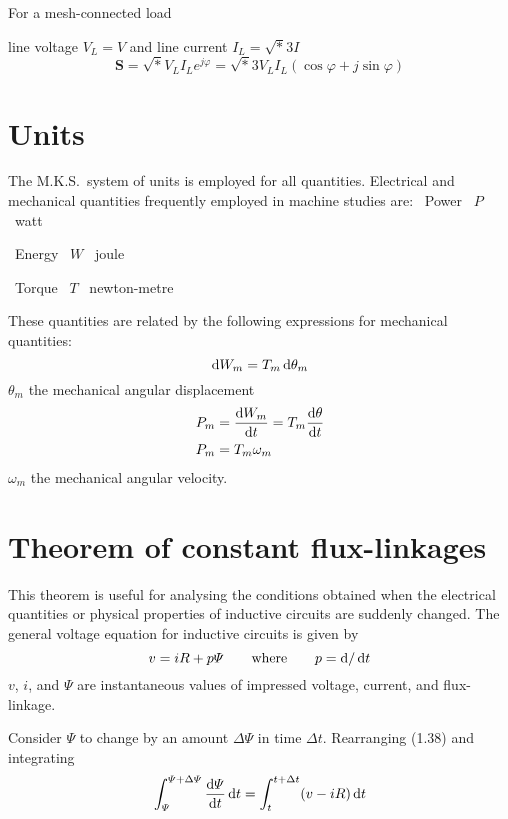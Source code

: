 \documentclass[a4paper,numbers=noenddot,12pt]{scrbook}
\begin{document}
For a mesh-connected load

\hspace{1cm} line voltage $V_L = V$ and line current $I_L = \sqrt* 3 I$
\begin{equation}
    \mathbf{S} = \sqrt*  V_L I_L e^{j \varphi} = \sqrt* 3 V_L I_L (\cos \varphi + j \sin \varphi)
    \label{eq:Eq1.35}
\end{equation}

\section{Units}
The M.K.S.\ system of units is employed for all quantities. Electrical and mechanical quantities frequently employed in machine studies are:
\TabPositions{3cm,4.5cm,5.2cm}
\tab\tab\ Power \tab\ $P$ \tab\ watt

\tab\ Energy \tab\ $W$ \tab\ joule

\tab\ Torque \tab\ $T$ \tab\ newton-metre

These quantities are related by the following expressions for mechanical quantities:
\begin{equation}
    \dif W_m = T_m \dif \theta_m
    \label{eq:Eq1.36}
\end{equation}
$\theta_m$ the mechanical angular displacement
\begin{align}
    P_m & = \dfrac{\dif W_m}{\dif t} = T_m \dfrac{\dif \theta}{\dif t} \nonumber \\
    P_m & = T_m \omega_m
    \label{eq:Eq1.37}
\end{align}
$\omega_m$ the mechanical angular velocity.

\section{Theorem of constant flux-linkages}
This theorem is useful for analysing the conditions obtained when the electrical quantities or physical properties of inductive circuits are suddenly changed. The general voltage equation for inductive circuits is given by
\begin{equation}
    v = iR + p\varPsi \qquad \text{where} \qquad p = \dif/\dif t
    \label{eq:Eq1.38}
\end{equation}
$v$, $i$, and $\varPsi$ are instantaneous values of impressed voltage, current, and flux-linkage.

Consider $\varPsi$ to change by an amount $\Delta \varPsi$ in time $\Delta t$. Rearranging (1.38) and integrating
\begin{equation*}
    \int_\varPsi^{\varPsi + \Delta \varPsi} \dfrac{\dif \varPsi}{\dif t} \dif t = \int_t^{t + \Delta t} (v - iR) \dif t 
\end{equation*}
\end{document}
